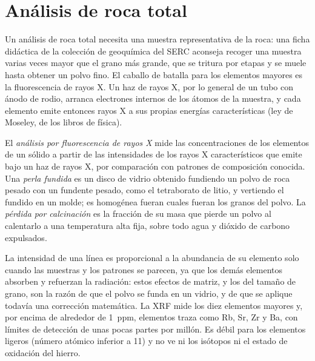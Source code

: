 
\section{Análisis de roca total}\label{sec:b2:field-lab-methods-2:whole-rock}

Un análisis de roca total necesita una muestra representativa de la roca: una ficha didáctica de la colección de
geoquímica del SERC aconseja recoger una muestra varias veces mayor que el grano más grande,
que se tritura por etapas y se muele hasta obtener un polvo fino. El caballo de batalla para los elementos mayores es la
fluorescencia de rayos X. Un haz de rayos X, por lo general de un tubo con ánodo de rodio, arranca electrones
internos de los átomos de la muestra, y cada elemento emite entonces rayos X a sus propias
energías características (ley de Moseley, de los libros de física).

\begin{definition}\label{def:b2:field-lab-methods-2:xrf}
El \emph{análisis por fluorescencia de rayos X} mide las concentraciones
de los elementos de un sólido a partir de las intensidades de los rayos X característicos que emite bajo un
haz de rayos X, por comparación con patrones de composición conocida. Una \emph{perla
fundida} es un disco de vidrio obtenido fundiendo un polvo de roca pesado con un fundente pesado,
como el tetraborato de litio, y vertiendo el fundido en un molde; es homogénea fueran cuales fueran los granos del
polvo. La \emph{pérdida por calcinación} es la fracción de su masa que
pierde un polvo al calentarlo a una temperatura alta fija, sobre todo agua y dióxido de carbono expulsados.
\end{definition}

La intensidad de una línea es proporcional a la abundancia de su elemento solo cuando las muestras y
los patrones se parecen, ya que los demás elementos absorben y refuerzan la radiación: estos efectos de
matriz, y los del tamaño de grano, son la razón de que el polvo se funda en un vidrio, y de que se aplique todavía una
corrección matemática. La XRF mide los diez elementos mayores y, por encima de alrededor de \qty{1}{ppm},
elementos traza como Rb, Sr, Zr y Ba, con límites de detección de unas pocas partes por millón. Es
débil para los elementos ligeros (número atómico inferior a 11) y no ve ni los isótopos ni el estado de oxidación
del hierro.

